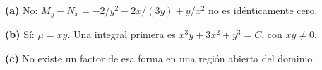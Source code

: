 \noindent\textbf{(a)} No: $M_y-N_x=-2/y^2-2x/(3y)+y/x^2$ no es idénticamente cero.

\noindent\textbf{(b)} Sí: $\mu=xy$. Una integral primera es $x^3y+3x^2+y^3=C$, con $xy\ne0$.

\noindent\textbf{(c)} No existe un factor de esa forma en una región abierta del dominio.
